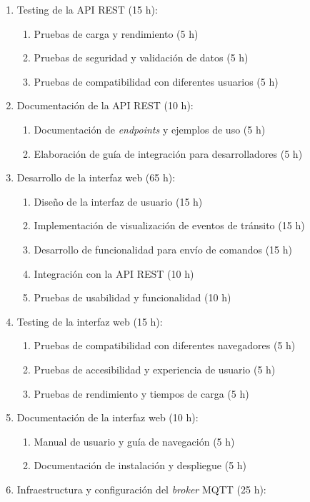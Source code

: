 \documentclass[
11pt, %
]{charter}
\begin{document}
\begin{enumerate}
\item Testing de la API REST (15 h):
\begin{enumerate}
\item Pruebas de carga y rendimiento (5 h)
\item Pruebas de seguridad y validación de datos (5 h)
\item Pruebas de compatibilidad con diferentes usuarios (5 h)
\end{enumerate}
\item Documentación de la API REST (10 h):
\begin{enumerate}
\item Documentación de  \textit{endpoints} y ejemplos de uso (5 h)
\item Elaboración de guía de integración para desarrolladores (5 h)
\end{enumerate}
\item Desarrollo de la interfaz web (65 h):
\begin{enumerate}
\item Diseño de la interfaz de usuario (15 h)
\item Implementación de visualización de eventos de tránsito (15 h)
\item Desarrollo de funcionalidad para envío de comandos (15 h)
\item Integración con la API REST (10 h)
\item Pruebas de usabilidad y funcionalidad (10 h)
\end{enumerate}
\item Testing de la interfaz web (15 h):
\begin{enumerate}
\item Pruebas de compatibilidad con diferentes navegadores (5 h)
\item Pruebas de accesibilidad y experiencia de usuario (5 h)
\item Pruebas de rendimiento y tiempos de carga (5 h)
\end{enumerate}
\item Documentación de la interfaz web (10 h):
\begin{enumerate}
\item Manual de usuario y guía de navegación (5 h)
\item Documentación de instalación y despliegue (5 h)
\end{enumerate}
\item Infraestructura y configuración del  \textit{broker} MQTT (25 h):
\begin{enumerate}

\end{enumerate}
\end{enumerate}
\end{document}
